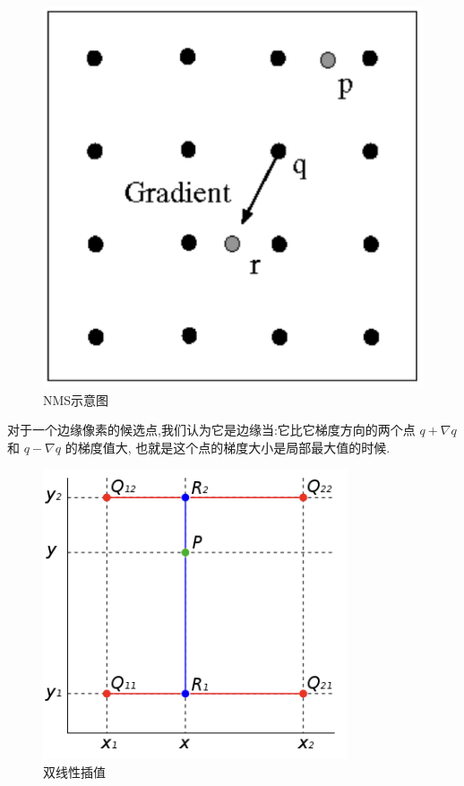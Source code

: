 \begin{figure}[htbp]
    \centering
	\includegraphics[scale=0.2]{figures/NMS.png}
	\caption{NMS示意图}
\end{figure}

对于一个边缘像素的候选点,我们认为它是边缘当:它比它梯度方向的两个点 $q+\nabla q$ 和 $q-\nabla q$ 的梯度值大,
也就是这个点的梯度大小是局部最大值的时候.

\begin{figure}[htbp]
    \centering
	\includegraphics[scale=0.4]{figures/bilinear.png}
	\caption{双线性插值}
\end{figure}


